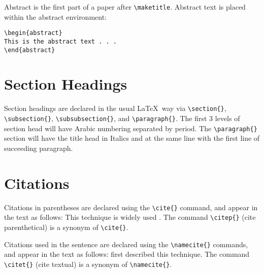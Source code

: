 \documentclass{clv3}
\begin{document}
Abstract is the first part of a paper after \verb|\maketitle|. Abstract text is
placed within the abstract environment:

\begin{verbatim}
\begin{abstract}
This is the abstract text . . .
\end{abstract}
\end{verbatim}

\section{Section Headings}

Section headings are declared in the usual \LaTeX\ way via \verb|\section{}|,
\verb|\subsection{}|, \verb|\subsubsection{}|, and \verb|\paragraph{}|. The
first 3 levels of section head will have Arabic numbering separated
by period. The \verb|\paragraph{}| section will have the title head in Italics
and at the same line with the first line of succeeding paragraph.

\section{Citations}
Citations in parentheses are declared using the \verb|\cite{}|
command, and appear in the text as follows:
This technique is widely used \cite{woods}.
The command \verb|\citep{}| (cite parenthetical) is a synonym of \verb|\cite{}|.

Citations used in the sentence are declared using the \verb|\namecite{}|
commands, and appear in the text as follows:
 first described this technique.
The command \verb|\citet{}| (cite textual) is a synonym of \verb|\namecite{}|.
\end{document}
